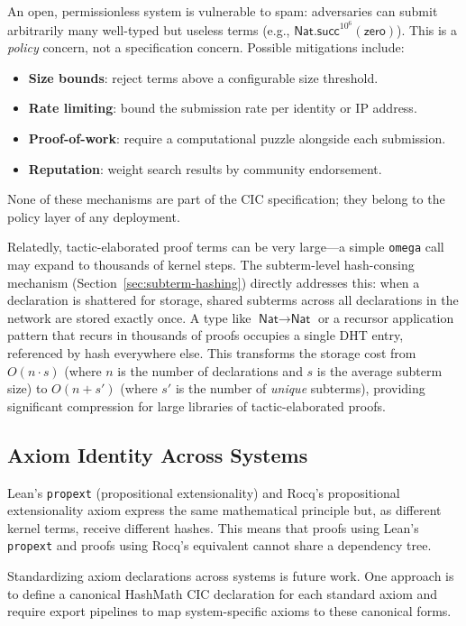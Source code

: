 \documentclass[11pt]{article}
\theoremstyle{definition}
\theoremstyle{plain}
\theoremstyle{remark}
\newcommand{\Nat}{\textsf{Nat}}
\begin{document}
An open, permissionless system is vulnerable to spam: adversaries can submit
arbitrarily many well-typed but useless terms (e.g., $\textsf{Nat.succ}^{10^6}(\textsf{zero})$).
This is a \emph{policy} concern, not a specification concern.
Possible mitigations include:
\begin{itemize}[nosep]
  \item \textbf{Size bounds}: reject terms above a configurable size threshold.
  \item \textbf{Rate limiting}: bound the submission rate per identity or IP address.
  \item \textbf{Proof-of-work}: require a computational puzzle alongside each submission.
  \item \textbf{Reputation}: weight search results by community endorsement.
\end{itemize}
None of these mechanisms are part of the CIC specification; they belong to the
policy layer of any deployment.

Relatedly, tactic-elaborated proof terms can be very large---a simple \texttt{omega} call
may expand to thousands of kernel steps.
The subterm-level hash-consing mechanism (Section~\ref{sec:subterm-hashing}) directly
addresses this: when a declaration is shattered for storage, shared subterms across
all declarations in the network are stored exactly once.
A type like $\Nat \to \Nat$ or a recursor application pattern that recurs in thousands
of proofs occupies a single DHT entry, referenced by hash everywhere else.
This transforms the storage cost from $O(n \cdot s)$ (where $n$ is the number of
declarations and $s$ is the average subterm size) to $O(n + s')$ (where $s'$ is the
number of \emph{unique} subterms), providing significant compression for large libraries
of tactic-elaborated proofs.

\subsection{Axiom Identity Across Systems}
\label{sec:axiom-identity}

Lean's \texttt{propext} (propositional extensionality) and Rocq's propositional extensionality
axiom express the same mathematical principle but, as different kernel terms, receive different hashes.
This means that proofs using Lean's \texttt{propext} and proofs using Rocq's equivalent
cannot share a dependency tree.

Standardizing axiom declarations across systems is future work.
One approach is to define a canonical HashMath CIC declaration for each standard axiom
and require export pipelines to map system-specific axioms to these canonical forms.
\end{document}
